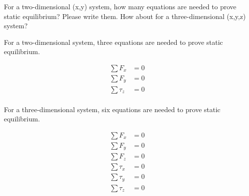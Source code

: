 For a two-dimensional (x,y) system, how many equations are needed to prove static equilibrium? Please write them. How about for a three-dimensional (x,y,z) system?

\begin{solution}
    For a two-dimensional system, three equations are needed to prove static equilibrium.
    
    \begin{align*}
        \sum F_x &= 0 \\
        \sum F_y &= 0 \\
        \sum \tau_z &= 0 \\
    \end{align*}
    
    For a three-dimensional system, six equations are needed to prove static equilibrium.
    
    \begin{align*}
        \sum F_x &= 0 \\
        \sum F_y &= 0 \\
        \sum F_z &= 0 \\
        \sum \tau_x &= 0 \\
        \sum \tau_y &= 0 \\
        \sum \tau_z &= 0 \\
    \end{align*}
\end{solution}
